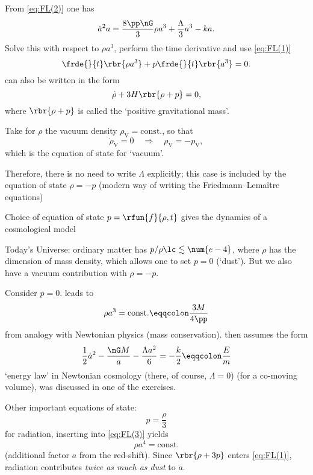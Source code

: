 From \cref{eq:FL(2)} one has
\begin{equation}
\dot{a}^2 a = \frac{8\pp\nG}{3}\rho a^3 + \frac{\Lambda}{3}a^3-ka.
\end{equation}
Solve this with respect to $\rho a^3$, perform the time derivative and use 
\cref{eq:FL(1)}
\begin{equation}
 \frde{}{t}\rbr{\rho a^3} + p\frde{}{t}\rbr{a^3} = 0.
 \label{eq:FL(3)}
\end{equation}
 can also be written in the form
\begin{equation}
 \dot{\rho} + 3H\rbr{\rho+p} = 0,
\end{equation}
where $\rbr{\rho+p}$ is called the `positive gravitational mass'.

Take for $\rho$ the vacuum density $\rho_\text{V} = \text{const.}$, so that
\begin{equation}
 \dot{\rho}_\text{V} = 0 \quad\Rightarrow\quad \rho_\text{V} = -p_\text{V},
\end{equation}
which is the equation of state for `vacuum'.

Therefore, there is no need to write $\Lambda$ explicitly; this case is 
included by the equation of state $\rho = -p$ (modern way of writing the 
Friedmann--Lemaître equations)

Choice of equation of state $p = \rfun{f}{\rho, t}$ gives the dynamics of a 
cosmological model

Today's Universe: ordinary matter has $p/\rho\lc \lesssim \num{e-4}$, where 
$\rho$ has the dimension of mass density, which allows one to set $p = 0$ 
(`dust'). But we also have a vacuum contribution with $\rho = -p$.

Consider $p = 0$.  leads to
\begin{equation}
 \rho a^3 = \text{const.} \eqqcolon \frac{3M}{4\pp}
\end{equation}
from analogy with Newtonian physics (mass conservation).  then 
assumes the form
\begin{equation}
\frac{1}{2}\dot{a}^2 - \frac{\nG M}{a} - \frac{\Lambda a^2}{6} = -\frac{k}{2}
\eqqcolon \frac{E}{m}
\end{equation}
`energy law' in Newtonian cosmology (there, of course, $\Lambda = 0$) (for a 
co-moving volume), was discussed in one of the exercises.

Other important equations of state:
\begin{equation}
p = \frac{\rho}{3}
\end{equation}
for radiation, inserting into \cref{eq:FL(3)} yields
\begin{equation}
 \rho a^4 = \text{const.}
\end{equation}
(additional factor $a$ from the red-shift). Since $\rbr{\rho+3p}$ enters 
\cref{eq:FL(1)}, radiation contributes \emph{twice as much as dust} to 
$\ddot{a}$.

